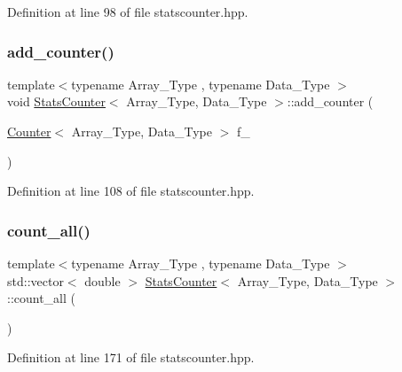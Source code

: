 Definition at line 98 of file statscounter.\+hpp.

\mbox{\label{class_stats_counter_ad175dcd2bd30d017881783de546ac333}} 
\subsubsection{\texorpdfstring{add\+\_\+counter()}{add\_counter()}\hspace{0.1cm}{\footnotesize\ttfamily [2/2]}}
{\footnotesize\ttfamily template$<$typename Array\+\_\+\+Type , typename Data\+\_\+\+Type $>$ \\
void \hyperlink{class_stats_counter}{Stats\+Counter}$<$ Array\+\_\+\+Type, Data\+\_\+\+Type $>$\+::add\+\_\+counter (\begin{DoxyParamCaption}\item[{\hyperlink{class_counter}{Counter}$<$ Array\+\_\+\+Type, Data\+\_\+\+Type $>$}]{f\+\_\+ }\end{DoxyParamCaption})\hspace{0.3cm}{\ttfamily [inline]}}



Definition at line 108 of file statscounter.\+hpp.

\mbox{\label{class_stats_counter_a83bd92031a1499109c98f238221cbd67}} 
\subsubsection{\texorpdfstring{count\+\_\+all()}{count\_all()}}
{\footnotesize\ttfamily template$<$typename Array\+\_\+\+Type , typename Data\+\_\+\+Type $>$ \\
std\+::vector$<$ double $>$ \hyperlink{class_stats_counter}{Stats\+Counter}$<$ Array\+\_\+\+Type, Data\+\_\+\+Type $>$\+::count\+\_\+all (\begin{DoxyParamCaption}{ }\end{DoxyParamCaption})\hspace{0.3cm}{\ttfamily [inline]}}



Definition at line 171 of file statscounter.\+hpp.

